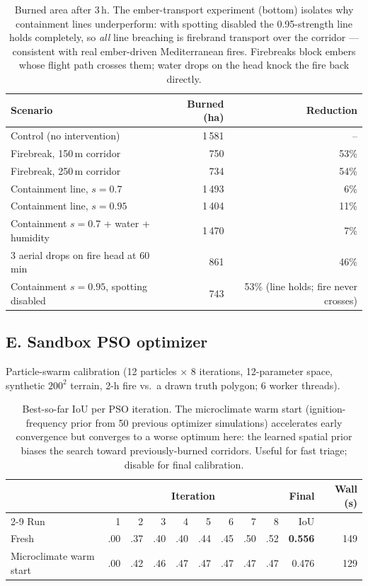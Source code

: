 \documentclass[11pt]{article}
\begin{document}
\begin{table}[htbp]
\centering
\caption{Burned area after 3\,h. The ember-transport experiment (bottom)
isolates why containment lines underperform: with spotting disabled the
0.95-strength line holds completely, so \emph{all} line breaching is
firebrand transport over the corridor --- consistent with real
ember-driven Mediterranean fires. Firebreaks block embers whose flight
path crosses them; water drops on the head knock the fire back directly.}
\begin{tabular}{lrr}
\toprule
Scenario & Burned (ha) & Reduction \\
\midrule
Control (no intervention)               & 1\,581 & --    \\
Firebreak, 150\,m corridor              &   750  & 53\%  \\
Firebreak, 250\,m corridor              &   734  & 54\%  \\
Containment line, $s=0.7$               & 1\,493 &  6\%  \\
Containment line, $s=0.95$              & 1\,404 & 11\%  \\
Containment $s=0.7$ + water + humidity  & 1\,470 &  7\%  \\
3 aerial drops on fire head at 60\,min  &   861  & 46\%  \\
\midrule
Containment $s=0.95$, spotting disabled &   743  & 53\% (line holds; fire never crosses) \\
\bottomrule
\end{tabular}
\end{table}

\subsection*{E. Sandbox PSO optimizer}

Particle-swarm calibration (12 particles $\times$ 8 iterations,
12-parameter space, synthetic $200^2$ terrain, 2-h fire vs.\ a drawn truth
polygon; 6 worker threads).

\begin{table}[htbp]
\centering
\caption{Best-so-far IoU per PSO iteration. The microclimate warm start
(ignition-frequency prior from 50 previous optimizer simulations)
accelerates early convergence but converges to a worse optimum here: the
learned spatial prior biases the search toward previously-burned corridors.
Useful for fast triage; disable for final calibration.}
\begin{tabular}{lrrrrrrrr@{\qquad}rr}
\toprule
 & \multicolumn{8}{c}{Iteration} & Final & Wall (s) \\
\cmidrule(lr){2-9}
Run & 1 & 2 & 3 & 4 & 5 & 6 & 7 & 8 & IoU & \\
\midrule
Fresh                  & .00 & .37 & .40 & .40 & .44 & .45 & .50 & .52 & \textbf{0.556} & 149 \\
Microclimate warm start& .00 & .42 & .46 & .47 & .47 & .47 & .47 & .47 & 0.476 & 129 \\
\bottomrule
\end{tabular}
\end{table}
\end{document}
